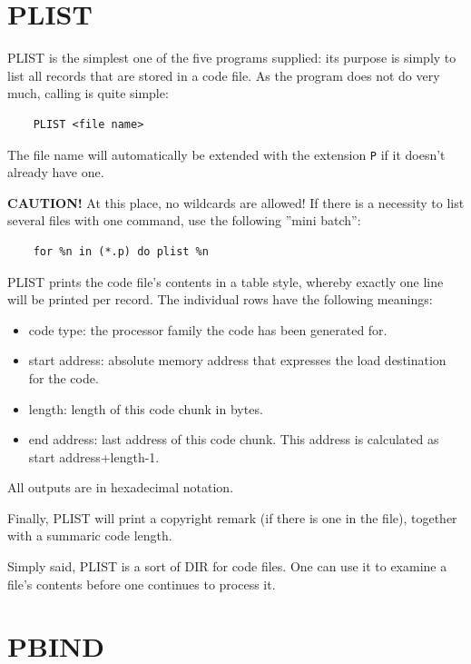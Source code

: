 \documentclass[12pt,twoside]{report}
\newcommand{\bb}[1]{{\bf #1}}
\newcommand{\tty}[1]{{\tt #1}}
\begin{document}

\section{PLIST}

PLIST is the simplest one of the five programs supplied: its purpose
is simply to list all records that are stored in a code file.  As the
program does not do very much, calling is quite simple:
\begin{verbatim}
    PLIST <file name>
\end{verbatim}
The file name will automatically be extended with the extension \tty{P} if
it doesn't already have one.

\bb{CAUTION!} At this place, no wildcards are allowed!  If there is a
necessity to list several files with one command, use the following
''mini batch'':
\begin{verbatim}
    for %n in (*.p) do plist %n
\end{verbatim}
PLIST prints the code file's contents in a table style, whereby
exactly one line will be printed per record.  The individual rows
have the following meanings:
\begin{itemize}
\item{code type: the processor family the code has been generated for.}
\item{start address: absolute memory address that expresses the load
      destination for the code.}
\item{length: length of this code chunk in bytes.}
\item{end address: last address of this code chunk.  This address
      is calculated as start address+length-1.}
\end{itemize}
All outputs are in hexadecimal notation.

Finally, PLIST will print a copyright remark (if there is one in the
file), together with a summaric code length.

Simply said, PLIST is a sort of DIR for code files.  One can use it
to examine a file's contents before one continues to process it.


\section{PBIND}
\end{document}
